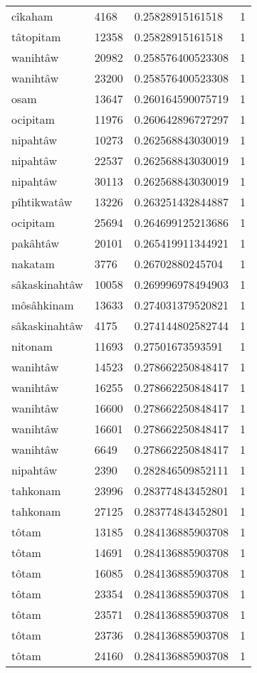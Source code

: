 \begin{longtable}{llll}
cîkaham & 4168 & 0.25828915161518 & 1 \\
tâtopitam & 12358 & 0.25828915161518 & 1 \\
wanihtâw & 20982 & 0.258576400523308 & 1 \\
wanihtâw & 23200 & 0.258576400523308 & 1 \\
osam & 13647 & 0.260164590075719 & 1 \\
ocipitam & 11976 & 0.260642896727297 & 1 \\
nipahtâw & 10273 & 0.262568843030019 & 1 \\
nipahtâw & 22537 & 0.262568843030019 & 1 \\
nipahtâw & 30113 & 0.262568843030019 & 1 \\
pîhtikwatâw & 13226 & 0.263251432844887 & 1 \\
ocipitam & 25694 & 0.264699125213686 & 1 \\
pakâhtâw & 20101 & 0.265419911344921 & 1 \\
nakatam & 3776 & 0.26702880245704 & 1 \\
sâkaskinahtâw & 10058 & 0.269996978494903 & 1 \\
môsâhkinam & 13633 & 0.274031379520821 & 1 \\
sâkaskinahtâw & 4175 & 0.274144802582744 & 1 \\
nitonam & 11693 & 0.27501673593591 & 1 \\
wanihtâw & 14523 & 0.278662250848417 & 1 \\
wanihtâw & 16255 & 0.278662250848417 & 1 \\
wanihtâw & 16600 & 0.278662250848417 & 1 \\
wanihtâw & 16601 & 0.278662250848417 & 1 \\
wanihtâw & 6649 & 0.278662250848417 & 1 \\
nipahtâw & 2390 & 0.282846509852111 & 1 \\
tahkonam & 23996 & 0.283774843452801 & 1 \\
tahkonam & 27125 & 0.283774843452801 & 1 \\
tôtam & 13185 & 0.284136885903708 & 1 \\
tôtam & 14691 & 0.284136885903708 & 1 \\
tôtam & 16085 & 0.284136885903708 & 1 \\
tôtam & 23354 & 0.284136885903708 & 1 \\
tôtam & 23571 & 0.284136885903708 & 1 \\
tôtam & 23736 & 0.284136885903708 & 1 \\
tôtam & 24160 & 0.284136885903708 & 1 \\

\end{longtable}
